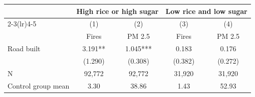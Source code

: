 {
\def\sym#1{\ifmmode^{#1}\else\(^{#1}\)\fi}
\begin{tabular}{l*{4}{c}}
\hline\hline
                         &\multicolumn{2}{c}{High rice or high sugar}&\multicolumn{2}{c}{Low rice and low sugar}\\\cmidrule(lr){2-3}\cmidrule(lr){4-5}
                         &\multicolumn{1}{c}{(1)}&\multicolumn{1}{c}{(2)}&\multicolumn{1}{c}{(3)}&\multicolumn{1}{c}{(4)}\\
                         &\multicolumn{1}{c}{Fires}&\multicolumn{1}{c}{PM 2.5}&\multicolumn{1}{c}{Fires}&\multicolumn{1}{c}{PM 2.5}\\
\hline
Road built               &       3.191** &       1.045***&       0.183   &       0.176   \\
                         &     (1.290)   &     (0.308)   &     (0.382)   &     (0.272)   \\
\hline
N                        &      92,772   &      92,772   &      31,920   &      31,920   \\
Control group mean       &        3.30   &       38.86   &        1.43   &       52.93   \\
\hline\hline
\end{tabular}
}
